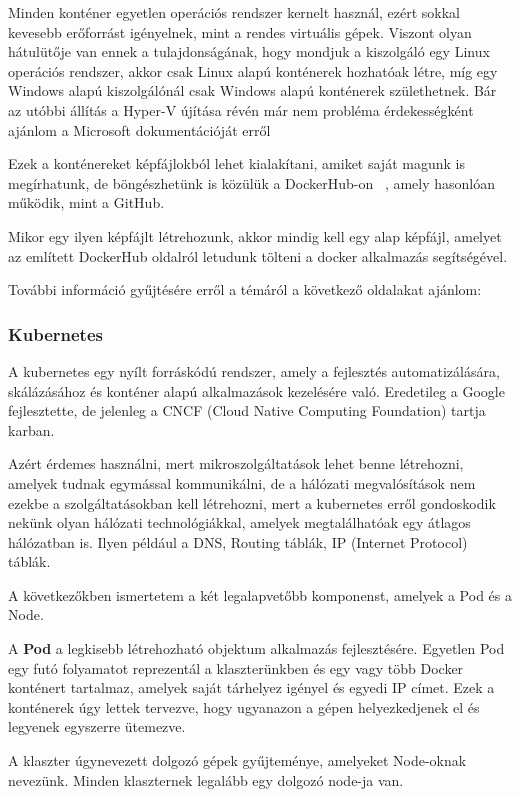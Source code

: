 \documentclass[a4paper,oneside]{article}
\begin{document}
Minden konténer egyetlen operációs rendszer kernelt használ, ezért sokkal
kevesebb erőforrást igényelnek, mint a rendes virtuális gépek. Viszont
olyan hátulütője van ennek a tulajdonságának, hogy mondjuk a kiszolgáló
egy Linux operációs rendszer, akkor csak Linux alapú konténerek hozhatóak
létre, míg egy Windows alapú kiszolgálónál csak Windows alapú konténerek
születhetnek. Bár az utóbbi állítás a Hyper-V újítása révén már nem probléma
érdekességként ajánlom a Microsoft dokumentációját erről ~\cite{linuxwindows}

Ezek a konténereket képfájlokból lehet kialakítani, amiket saját magunk is
megírhatunk, de böngészhetünk is közülük a DockerHub-on ~\cite{dockerhub},
amely hasonlóan működik, mint a GitHub.

Mikor egy ilyen képfájlt létrehozunk, akkor mindig kell egy alap képfájl,
amelyet az említett DockerHub oldalról letudunk tölteni a docker alkalmazás
segítségével.

További információ gyűjtésére erről a témáról a következő oldalakat ajánlom:
~\cite{dockeroff} ~\cite{dockerwiki}

\subsubsection{Kubernetes}
A kubernetes egy nyílt forráskódú rendszer, amely a fejlesztés automatizálására,
skálázásához és konténer alapú alkalmazások kezelésére való. Eredetileg a
Google fejlesztette, de jelenleg a CNCF (Cloud Native Computing Foundation)
tartja karban.

Azért érdemes használni, mert mikroszolgáltatások lehet benne létrehozni, amelyek
tudnak egymással kommunikálni, de a hálózati megvalósítások nem ezekbe a szolgáltatásokban
kell létrehozni, mert a kubernetes erről gondoskodik nekünk olyan hálózati technológiákkal,
amelyek megtalálhatóak egy átlagos hálózatban is. Ilyen például a DNS, Routing táblák,
IP (Internet Protocol) táblák.

A következőkben ismertetem a két legalapvetőbb komponenst, amelyek a Pod és a Node.

A \textbf{Pod} a legkisebb létrehozható objektum alkalmazás fejlesztésére. Egyetlen
Pod egy futó folyamatot reprezentál a klaszterünkben és egy vagy több Docker
konténert tartalmaz, amelyek saját tárhelyez igényel és egyedi IP címet.
Ezek a konténerek úgy lettek tervezve, hogy ugyanazon a gépen helyezkedjenek el
és legyenek egyszerre ütemezve.

A klaszter úgynevezett dolgozó gépek gyűjteménye, amelyeket Node-oknak nevezünk.
Minden klaszternek legalább egy dolgozó node-ja van.
\end{document}
